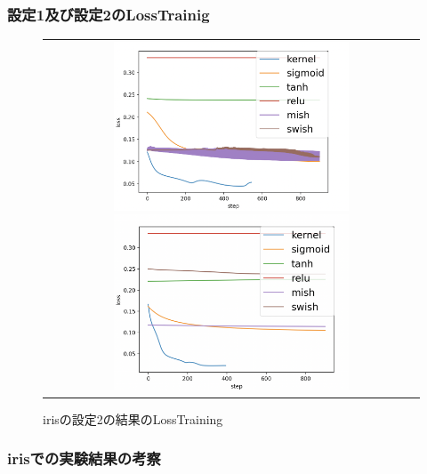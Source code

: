 \subsubsection{設定1及び設定2のLossTrainig}
\label{iris:loss}



\begin{figure}[hbtp]
    \begin{center}
        \begin{tabular}{c}
            \begin{minipage}{0.5\hsize}
                \includegraphics[clip, width=7cm]{asset/iris_0.1_1000_3_02_sgd_non_kaiming_uniform.png}
                    \caption{irisの設定1の結果のLossTraining}
                    \label{iris_1}
            \end{minipage}
            \hspace{10pt}
            \begin{minipage}{0.5\hsize}
                \includegraphics[clip, width=7cm]{asset/iris_0.1_1000_3_02_sgd_l2_kaiming_uniform.png}
                    \caption{irisの設定2の結果のLossTraining}
                    \label{iris_2}
            \end{minipage}
        \end{tabular}
    \end{center}
\end{figure}


\subsubsection{irisでの実験結果の考察}


